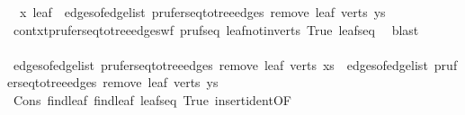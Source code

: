 \begin{isabellebody}
\ {}{\isacharcolon}{\kern0pt}\ {\isachardoublequoteopen}{\isacharbraceleft}{\kern0pt}x{\isacharcomma}{\kern0pt}\ leaf{\isacharbraceright}{\kern0pt}\ {\isasymnotin}\ edges{\isacharunderscore}{\kern0pt}of{\isacharunderscore}{\kern0pt}edge{\isacharunderscore}{\kern0pt}list\ {\isacharparenleft}{\kern0pt}prufer{\isacharunderscore}{\kern0pt}seq{\isacharunderscore}{\kern0pt}to{\isacharunderscore}{\kern0pt}tree{\isacharunderscore}{\kern0pt}edges\ {\isacharparenleft}{\kern0pt}remove{}\ leaf\ verts{\isacharparenright}{\kern0pt}\ ys{\isacharparenright}{\kern0pt}{\isachardoublequoteclose}\ \isamarkupfalse%
\ contxt{\isacharprime}{\kern0pt}{\isachardot}{\kern0pt}prufer{\isacharunderscore}{\kern0pt}seq{\isacharunderscore}{\kern0pt}to{\isacharunderscore}{\kern0pt}tree{\isacharunderscore}{\kern0pt}edges{\isacharunderscore}{\kern0pt}wf\ pruf{\isacharunderscore}{\kern0pt}seq{}{\isacharprime}{\kern0pt}\ leaf{\isacharunderscore}{\kern0pt}not{\isacharunderscore}{\kern0pt}in{\isacharunderscore}{\kern0pt}verts{\isacharprime}{\kern0pt}\ True\ leafs{\isacharunderscore}{\kern0pt}eq\ \isamarkupfalse%
\ blast\isanewline
\ \ \ \ \ \ \isamarkupfalse%
\ \isamarkupfalse%
\ {\isachardoublequoteopen}edges{\isacharunderscore}{\kern0pt}of{\isacharunderscore}{\kern0pt}edge{\isacharunderscore}{\kern0pt}list\ {\isacharparenleft}{\kern0pt}prufer{\isacharunderscore}{\kern0pt}seq{\isacharunderscore}{\kern0pt}to{\isacharunderscore}{\kern0pt}tree{\isacharunderscore}{\kern0pt}edges\ {\isacharparenleft}{\kern0pt}remove{}\ leaf\ verts{\isacharparenright}{\kern0pt}\ xs{\isacharparenright}{\kern0pt}\ {\isacharequal}{\kern0pt}\ edges{\isacharunderscore}{\kern0pt}of{\isacharunderscore}{\kern0pt}edge{\isacharunderscore}{\kern0pt}list\ {\isacharparenleft}{\kern0pt}prufer{\isacharunderscore}{\kern0pt}seq{\isacharunderscore}{\kern0pt}to{\isacharunderscore}{\kern0pt}tree{\isacharunderscore}{\kern0pt}edges\ {\isacharparenleft}{\kern0pt}remove{}\ leaf\ verts{\isacharparenright}{\kern0pt}\ ys{\isacharparenright}{\kern0pt}{\isachardoublequoteclose}\isanewline
\ \ \ \ \ \ \ \ \isamarkupfalse%
\ Cons{\isacharparenleft}{\kern0pt}{}{\isacharparenright}{\kern0pt}\ find{\isacharunderscore}{\kern0pt}leaf\ find{\isacharunderscore}{\kern0pt}leaf{}\ leafs{\isacharunderscore}{\kern0pt}eq\ True\ insert{\isacharunderscore}{\kern0pt}ident{\isacharbrackleft}{\kern0pt}OF\ {}\ {}{\isacharbrackright}{\kern0pt}\ \isamarkupfalse%

\end{isabellebody}
